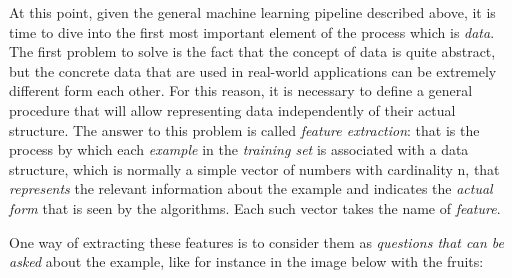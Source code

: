 At this point, given the general machine learning pipeline described
above, it is time to dive into the first most important element of
the process which is \emph{data}. The first
problem to solve is the fact that the concept of data is quite abstract,
but the concrete data that are used in real-world applications can be
extremely different form each other. For this reason, it is necessary to
define a general procedure that will allow representing data
independently of their actual structure. The answer to this problem is
called \emph{feature extraction}: that is the process by which each
\emph{example} in the \emph{training set} is associated with a data
structure, which is normally a simple vector of numbers with cardinality
n, that \emph{represents} the relevant information about the example and
indicates the \emph{actual form} that is seen by the algorithms. Each
such vector takes the name of \emph{feature}.

\newpage

One way of extracting these features is to consider them as
\emph{questions that can be asked} about the example, like for instance
in the image below with the fruits:

\vspace{5mm}

